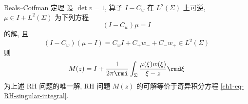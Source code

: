 \begin{theorem}{Beals--Coifman 定理}
    设 $ \det v = 1 $, 算子 $ I - C_{w} $ 在 $ L^{2}(\Sigma) $ 上可逆, $ \mu \in I +L^{2}(\Sigma) $ 为下列方程
    \begin{equation}
        (I - C_{w}) \mu = I \label{ch1-eq-RH-singular-integral}
    \end{equation}
    的解, 且
    \begin{equation}
        (I -C_{w})(\mu - I) = C_{w}I + C_{+}w_{-} + C_{-}w_{+} \in L^{2}(\Sigma)
    \end{equation}
    则
    \begin{equation}
        M(z) = I + \frac{1}{2 \pi \rmi} \int_{\Sigma} \frac{\mu(\xi) w(\xi)}{\xi - z} \rmd \xi \label{ch1-eq-RH-singular-integral-matrix}
    \end{equation}
    为上述 RH 问题的唯一解, RH 问题 $ M(z) $ 的可解等价于奇异积分方程 \eqref{ch1-eq-RH-singular-integral}.
\end{theorem}
